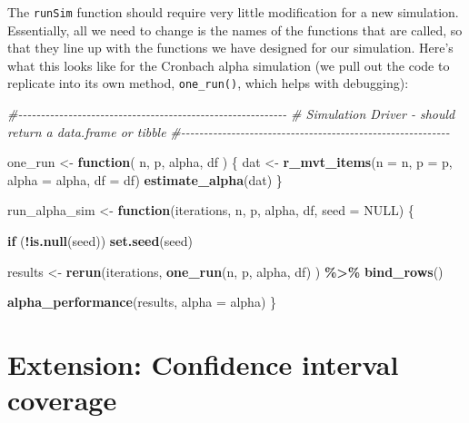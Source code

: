\documentclass[
]{book}
\newenvironment{Shaded}{\begin{snugshade}}{\end{snugshade}}
\newcommand{\AttributeTok}[1]{\textcolor[rgb]{0.13,0.29,0.53}{#1}}
\newcommand{\CommentTok}[1]{\textcolor[rgb]{0.56,0.35,0.01}{\textit{#1}}}
\newcommand{\ConstantTok}[1]{\textcolor[rgb]{0.56,0.35,0.01}{#1}}
\newcommand{\ControlFlowTok}[1]{\textcolor[rgb]{0.13,0.29,0.53}{\textbf{#1}}}
\newcommand{\FunctionTok}[1]{\textcolor[rgb]{0.13,0.29,0.53}{\textbf{#1}}}
\newcommand{\NormalTok}[1]{#1}
\newcommand{\OtherTok}[1]{\textcolor[rgb]{0.56,0.35,0.01}{#1}}
\newcommand{\SpecialCharTok}[1]{\textcolor[rgb]{0.81,0.36,0.00}{\textbf{#1}}}
\begin{document}
The \texttt{runSim} function should require very little modification for a new simulation. Essentially, all we need to change is the names of the functions that are called, so that they line up with the functions we have designed for our simulation. Here's what this looks like for the Cronbach alpha simulation (we pull out the code to replicate into its own method, \texttt{one\_run()}, which helps with debugging):

\begin{Shaded}
\begin{Highlighting}[]
\CommentTok{\#{-}{-}{-}{-}{-}{-}{-}{-}{-}{-}{-}{-}{-}{-}{-}{-}{-}{-}{-}{-}{-}{-}{-}{-}{-}{-}{-}{-}{-}{-}{-}{-}{-}{-}{-}{-}{-}{-}{-}{-}{-}{-}{-}{-}{-}{-}{-}{-}{-}{-}{-}{-}{-}{-}{-}{-}{-}{-}{-}}
\CommentTok{\# Simulation Driver {-} should return a data.frame or tibble}
\CommentTok{\#{-}{-}{-}{-}{-}{-}{-}{-}{-}{-}{-}{-}{-}{-}{-}{-}{-}{-}{-}{-}{-}{-}{-}{-}{-}{-}{-}{-}{-}{-}{-}{-}{-}{-}{-}{-}{-}{-}{-}{-}{-}{-}{-}{-}{-}{-}{-}{-}{-}{-}{-}{-}{-}{-}{-}{-}{-}{-}{-}}


\NormalTok{one\_run }\OtherTok{\textless{}{-}} \ControlFlowTok{function}\NormalTok{( n, p, alpha, df ) \{}
\NormalTok{    dat }\OtherTok{\textless{}{-}} \FunctionTok{r\_mvt\_items}\NormalTok{(}\AttributeTok{n =}\NormalTok{ n, }\AttributeTok{p =}\NormalTok{ p, }\AttributeTok{alpha =}\NormalTok{ alpha, }\AttributeTok{df =}\NormalTok{ df)}
    \FunctionTok{estimate\_alpha}\NormalTok{(dat)}
\NormalTok{\}}


\NormalTok{run\_alpha\_sim }\OtherTok{\textless{}{-}} \ControlFlowTok{function}\NormalTok{(iterations, n, p, alpha, df, }\AttributeTok{seed =} \ConstantTok{NULL}\NormalTok{) \{}
  
  \ControlFlowTok{if}\NormalTok{ (}\SpecialCharTok{!}\FunctionTok{is.null}\NormalTok{(seed)) }\FunctionTok{set.seed}\NormalTok{(seed)}

\NormalTok{  results }\OtherTok{\textless{}{-}} 
    \FunctionTok{rerun}\NormalTok{(iterations, }\FunctionTok{one\_run}\NormalTok{(n, p, alpha, df) ) }\SpecialCharTok{\%\textgreater{}\%}
    \FunctionTok{bind\_rows}\NormalTok{()}
  
  \FunctionTok{alpha\_performance}\NormalTok{(results, }\AttributeTok{alpha =}\NormalTok{ alpha)}
\NormalTok{\}}
\end{Highlighting}
\end{Shaded}

\section{Extension: Confidence interval coverage}\label{extension-confidence-interval-coverage}
\end{document}
